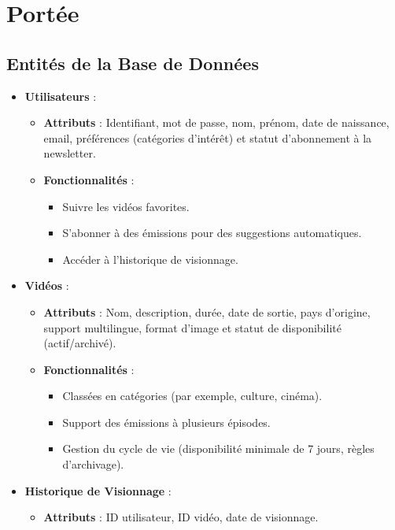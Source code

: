 \documentclass{article}
\begin{document}
\section{Portée}

\subsection{Entités de la Base de Données}

\begin{itemize}
    \item \textbf{Utilisateurs} :
    \begin{itemize}
        \item \textbf{Attributs} : Identifiant, mot de passe, nom, prénom, date de naissance, email, préférences (catégories d'intérêt) et statut d'abonnement à la newsletter.
        \item \textbf{Fonctionnalités} :
        \begin{itemize}
            \item Suivre les vidéos favorites.
            \item S'abonner à des émissions pour des suggestions automatiques.
            \item Accéder à l'historique de visionnage.
        \end{itemize}
    \end{itemize}
    \item \textbf{Vidéos} :
    \begin{itemize}
        \item \textbf{Attributs} : Nom, description, durée, date de sortie, pays d'origine, support multilingue, format d'image et statut de disponibilité (actif/archivé).
        \item \textbf{Fonctionnalités} :
        \begin{itemize}
            \item Classées en catégories (par exemple, culture, cinéma).
            \item Support des émissions à plusieurs épisodes.
            \item Gestion du cycle de vie (disponibilité minimale de 7 jours, règles d'archivage).
        \end{itemize}
    \end{itemize}
    \item \textbf{Historique de Visionnage} :
    \begin{itemize}
        \item \textbf{Attributs} : ID utilisateur, ID vidéo, date de visionnage.

\end{itemize}
\end{itemize}
\end{document}
